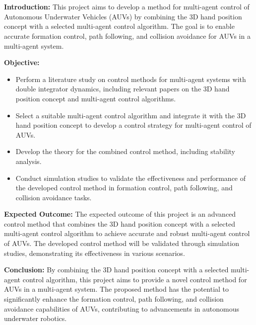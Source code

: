 \chapter*{\englishproblemname}

\textbf{Introduction: }
This project aims to develop a method for multi-agent control of Autonomous Underwater Vehicles (AUVs) by combining the 3D hand position concept with a selected multi-agent control algorithm. The goal is to enable accurate formation control, path following, and collision avoidance for AUVs in a multi-agent system.

\textbf{Objective: }
\begin{itemize}
    \item Perform a literature study on control methods for multi-agent systems with double integrator dynamics, including relevant papers on the 3D hand position concept and multi-agent control algorithms.
    \item Select a suitable multi-agent control algorithm and integrate it with the 3D hand position concept to develop a control strategy for multi-agent control of AUVs.
    \item Develop the theory for the combined control method, including stability analysis.
    \item Conduct simulation studies to validate the effectiveness and performance of the developed control method in formation control, path following, and collision avoidance tasks.
\end{itemize}


\textbf{Expected Outcome: }
The expected outcome of this project is an advanced control method that combines the 3D hand position concept with a selected multi-agent control algorithm to achieve accurate and robust multi-agent control of AUVs. The developed control method will be validated through simulation studies, demonstrating its effectiveness in various scenarios.


\textbf{Conclusion: }
By combining the 3D hand position concept with a selected multi-agent control algorithm, this project aims to provide a novel control method for AUVs in a multi-agent system. The proposed method has the potential to significantly enhance the formation control, path following, and collision avoidance capabilities of AUVs, contributing to advancements in autonomous underwater robotics.



